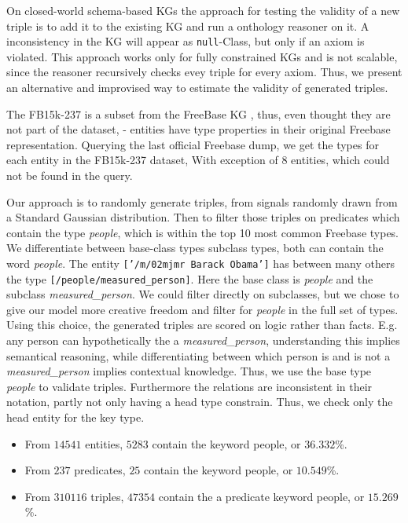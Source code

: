 On closed-world schema-based KGs the approach for testing the validity of a new triple is to add it to the existing KG and run a onthology reasoner on it. A inconsistency in the KG will appear as \texttt{null}-Class, but only if an axiom is violated. This approach works only for fully constrained KGs and is not scalable, since the reasoner recursively checks evey triple for every axiom. Thus, we present an alternative and improvised way to estimate the validity of generated triples.

The FB15k-237 is a subset from the FreeBase KG \cite{FREEBASE}, thus, even thought they are not part of the dataset, - entities have type properties in their original Freebase representation. 
Querying the last official Freebase dump, we get the types for each entity in the FB15k-237 dataset, With exception of $8$ entities, which could not be found in the query.

Our approach is to randomly generate triples, from signals randomly drawn from a Standard Gaussian distribution. Then to filter those triples on predicates which contain the type \textit{people}, which is within the top 10 most common Freebase types. We differentiate between base-class types subclass types, both can contain the word \textit{people}. The entity \texttt{['/m/02mjmr Barack Obama']} has between many others the type \texttt{[/people/measured\_person]}. Here the base class is \textit{people} and the subclass \textit{measured\_person}. We could filter directly on subclasses, but we chose to give our model more creative freedom and filter for \textit{people} in the full set of types. Using this choice, the generated triples are scored on logic rather than facts. E.g. any person can hypothetically the a \textit{measured\_person}, understanding this implies semantical reasoning, while differentiating between which person is and is not a \textit{measured\_person} implies contextual knowledge. Thus, we use the base type \textit{people} to validate triples.
Furthermore the relations are inconsistent in their notation, partly not only having a head type constrain. Thus, we check only the head entity for the key type. 

\begin{itemize}
  \item From $14541$ entities, $5283$ contain the keyword people, or $36.332$\%.
  \item From $237$ predicates, $25$ contain the keyword people, or $10.549$\%.
  \item From $310116$ triples, $47354$ contain the a predicate keyword people, or $15.269$\%.
\end{itemize}

